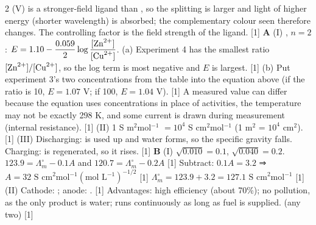 \documentclass[10pt,a4paper]{extarticle}
\newcommand{\mk}[1]{{\scriptsize\color{black!55}[#1]}}
\begin{document}
\begin{multicols}{2}
(V)  is a stronger-field ligand than , so the splitting is larger and light of higher energy (shorter wavelength) is absorbed; the complementary colour seen therefore changes. The controlling factor is the field strength of the ligand. \mk{1}
\An \textbf{A} (I) , $n=2$: $E=1.10-\dfrac{0.059}{2}\log\dfrac{[\ce{Zn^2+}]}{[\ce{Cu^2+}]}$.\nl
(a) Experiment 4 has the smallest ratio $[\ce{Zn^2+}]/[\ce{Cu^2+}]$, so the log term is most negative and $E$ is largest. \mk{1}\nl
(b) \chk Put experiment 3's two concentrations from the table into the equation above (if the ratio is 10, $E=1.07$ V; if 100, $E=1.04$ V). \mk{1} A measured value can differ because the equation uses concentrations in place of activities, the temperature may not be exactly 298 K, and some current is drawn during measurement (internal resistance). \mk{1}\nl
(II) 1 S m$^2$mol$^{-1}$ $=10^{4}$ S cm$^2$mol$^{-1}$ (1 m$^2$ = $10^4$ cm$^2$). \mk{1}\nl
(III) Discharging:  is used up and water forms, so the specific gravity falls. Charging:  is regenerated, so it rises. \mk{1}\nl
\textbf{B} (I) $\sqrt{0.010}=0.1$, $\sqrt{0.040}=0.2$.\nl
$123.9=\Lambda^\circ_m-0.1A$ and $120.7=\Lambda^\circ_m-0.2A$ \mk{1}\nl
Subtract: $0.1A=3.2$ ⇒ $A=\boxed{32\text{ S cm}^2\text{mol}^{-1}(\text{mol L}^{-1})^{-1/2}}$ \mk{1}\nl
$\Lambda^\circ_m=123.9+3.2=\boxed{127.1\text{ S cm}^2\text{mol}^{-1}}$ \mk{1}\nl
(II) Cathode: ; anode: . \mk{1}\nl
Advantages: high efficiency (about 70\%); no pollution, as the only product is water; runs continuously as long as fuel is supplied. (any two) \mk{1}
\end{multicols}
\end{document}
